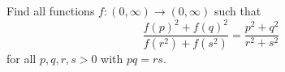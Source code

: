 Find all functions $f : (0, \infty) \to (0, \infty)$ such that
\[
\frac{f(p)^2 + f(q)^2}{f(r^2) + f(s^2)} = \frac{p^2 + q^2}{r^2 + s^2}
\]
for all $p, q, r, s > 0$ with $pq = rs$.
